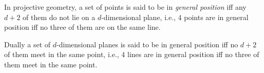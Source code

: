 \documentclass[12pt]{article}
\begin{document}
In projective geometry, a set of points is said to be in \emph{general position} iff any $d+2$ of them do not lie on a $d$-dimensional plane, i.e., 4 points are in general position iff no three of them are on the same line.

Dually a set of $d$-dimensional planes is said to be in general position iff no $d+2$ of them meet in the same point, i.e., 4 lines are in general position iff no three of them meet in the same point.
\end{document}

